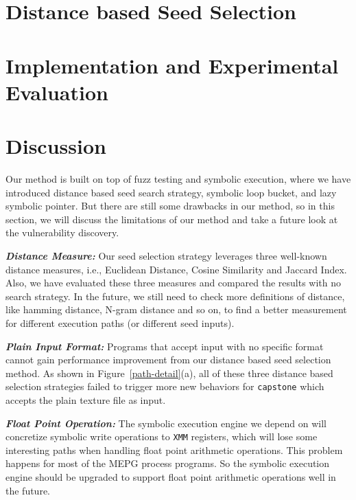 \documentclass[a4paper]{article}
\begin{document}
\section{Distance based Seed Selection} \label{sec:seed selection}


\section{Implementation and Experimental Evaluation} \label{sec:evaluate}




\section{Discussion} \label{sec:discussion}
Our method is built on top of fuzz testing and symbolic execution, where we have introduced distance based seed search strategy, symbolic loop bucket, and lazy symbolic pointer. But there are still some drawbacks in our method, so in this section, we will discuss the limitations of our method and take a future look at the vulnerability discovery.

\noindent\textit{\textbf{Distance Measure:}} Our seed selection strategy leverages three well-known distance measures, i.e., Euclidean Distance, Cosine Similarity and Jaccard Index. Also, we have evaluated these three measures and compared the results with no search strategy. In the future, we still need to check more definitions of distance, like hamming distance, N-gram distance and so on, to find a better measurement for different execution paths (or different seed inputs). 

\noindent\textit{\textbf{Plain Input Format:}} Programs that accept input with no specific format cannot gain performance improvement from our distance based seed selection method.
 As shown in Figure~\ref{path-detail}(a), all of these three distance based selection strategies failed to trigger more new behaviors for \texttt{capstone} which accepts the plain texture file as input. 

\noindent\textit{\textbf{Float Point Operation:}} The symbolic execution engine we depend on will concretize symbolic write operations to \texttt{XMM} registers, which will lose some interesting paths when handling float point arithmetic operations. This problem happens for most of the MEPG process programs. So the symbolic execution engine should be upgraded to support float point arithmetic operations well in the future.
\end{document}
